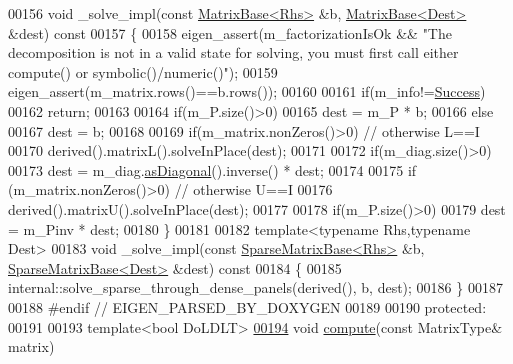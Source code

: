 \begin{DoxyCode}
00156     \textcolor{keywordtype}{void} \_solve\_impl(\textcolor{keyword}{const} \hyperlink{group___core___module_class_eigen_1_1_matrix_base}{MatrixBase<Rhs>} &b, \hyperlink{group___core___module_class_eigen_1_1_matrix_base}{MatrixBase<Dest>} &dest)\textcolor{keyword}{ const}
00157 \textcolor{keyword}{    }\{
00158       eigen\_assert(m\_factorizationIsOk && \textcolor{stringliteral}{"The decomposition is not in a valid state for solving, you must
       first call either compute() or symbolic()/numeric()"});
00159       eigen\_assert(m\_matrix.rows()==b.rows());
00160 
00161       \textcolor{keywordflow}{if}(m\_info!=\hyperlink{group__enums_gga85fad7b87587764e5cf6b513a9e0ee5ea52581b035f4b59c203b8ff999ef5fcea}{Success})
00162         \textcolor{keywordflow}{return};
00163 
00164       \textcolor{keywordflow}{if}(m\_P.size()>0)
00165         dest = m\_P * b;
00166       \textcolor{keywordflow}{else}
00167         dest = b;
00168 
00169       \textcolor{keywordflow}{if}(m\_matrix.nonZeros()>0) \textcolor{comment}{// otherwise L==I}
00170         derived().matrixL().solveInPlace(dest);
00171 
00172       \textcolor{keywordflow}{if}(m\_diag.size()>0)
00173         dest = m\_diag.\hyperlink{group___core___module_a14235b62c90f93fe910070b4743782d0}{asDiagonal}().inverse() * dest;
00174 
00175       \textcolor{keywordflow}{if} (m\_matrix.nonZeros()>0) \textcolor{comment}{// otherwise U==I}
00176         derived().matrixU().solveInPlace(dest);
00177 
00178       \textcolor{keywordflow}{if}(m\_P.size()>0)
00179         dest = m\_Pinv * dest;
00180     \}
00181     
00182     \textcolor{keyword}{template}<\textcolor{keyword}{typename} Rhs,\textcolor{keyword}{typename} Dest>
00183     \textcolor{keywordtype}{void} \_solve\_impl(\textcolor{keyword}{const} \hyperlink{group___sparse_core___module_class_eigen_1_1_sparse_matrix_base}{SparseMatrixBase<Rhs>} &b, 
      \hyperlink{group___sparse_core___module_class_eigen_1_1_sparse_matrix_base}{SparseMatrixBase<Dest>} &dest)\textcolor{keyword}{ const}
00184 \textcolor{keyword}{    }\{
00185       internal::solve\_sparse\_through\_dense\_panels(derived(), b, dest);
00186     \}
00187 
00188 \textcolor{preprocessor}{#endif // EIGEN\_PARSED\_BY\_DOXYGEN}
00189 
00190   \textcolor{keyword}{protected}:
00191     
00193     \textcolor{keyword}{template}<\textcolor{keywordtype}{bool} DoLDLT>
\hyperlink{group___sparse_cholesky___module_a9a741744dda2261cae26cddf96a35bf0}{00194}     \textcolor{keywordtype}{void} \hyperlink{group___sparse_cholesky___module_a9a741744dda2261cae26cddf96a35bf0}{compute}(\textcolor{keyword}{const} MatrixType& matrix)

\end{DoxyCode}
